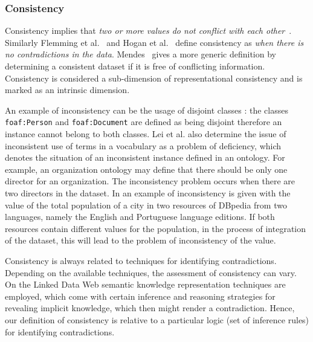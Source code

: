 \subsubsection{Consistency} 
Consistency implies that \emph{two or more values do not conflict with each other}~\cite{Bizerthesis}. 
Similarly Flemming et al.~\cite{Flemming} and Hogan et al.~\cite{Hogan} define consistency as \emph{when there is no contradictions in the data}. 
Mendes~\cite{Mendes} gives a more generic definition by determining a consistent dataset if it is free of conflicting information.
Consistency is considered a sub-dimension of representational consistency and is marked as an intrinsic dimension. 

An example of inconsistency can be the usage of disjoint classes \cite{Hogan}: the classes \texttt{foaf:Person} and \texttt{foaf:Document} are defined as being disjoint therefore an instance cannot belong to both classes. 
Lei et al. \cite{Lei} also determine the issue of inconsistent use of terms in a vocabulary as a problem of deficiency, which denotes the situation of an inconsistent instance defined in an ontology. 
For example, an organization ontology may define that there should be only one director for an organization. 
The inconsistency problem occurs when there are two directors in the dataset.
In \cite{Mendes} an example of inconsistency is given with the value of the total population of a city in two resources of DBpedia from two languages, namely the English and Portuguese language editions. 
If both resources contain different values for the population, in the process of integration of the dataset, this will lead to the problem of inconsistency of the value. 

\begin{definition}[Consistency]
Consistency is always related to techniques for identifying contradictions.
Depending on the available techniques, the assessment of consistency can vary.
On the Linked Data Web semantic knowledge representation techniques are employed, which come with certain inference and reasoning strategies for revealing implicit knowledge, which then might render a contradiction.
Hence, our definition of consistency is relative to a particular logic (set of inference rules) for identifying contradictions.
\end{definition}

